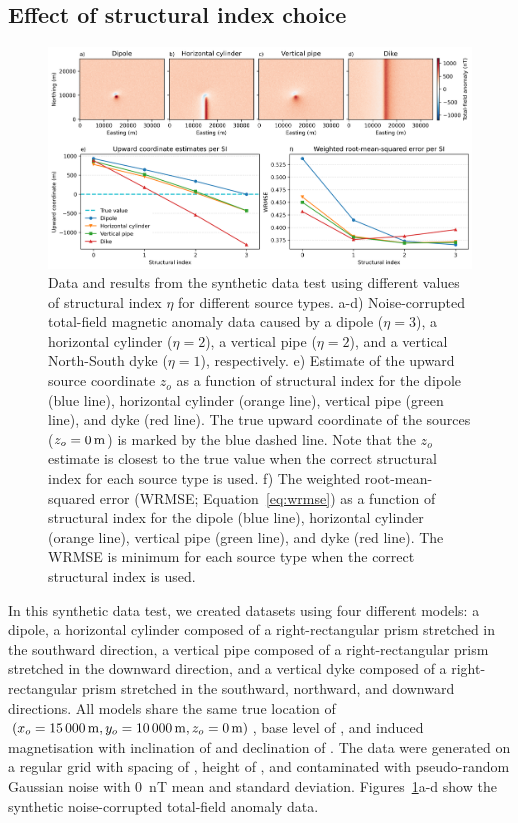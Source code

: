 \subsection{Effect of structural index choice}
\label{sec:si}

\begin{figure}[tb!]
\centering
\includegraphics[width=1\linewidth]{euler-inversion/figures/synthetic-structural-index.png}
\caption{
    Data and results from the synthetic data test using different values of structural index $\eta$ for different source types.
    a-d) Noise-corrupted total-field magnetic anomaly data caused by a dipole ($\eta=3$), a horizontal cylinder ($\eta=2$), a vertical pipe ($\eta=2$), and a vertical North-South dyke ($\eta=1$), respectively.
    e) Estimate of the upward source coordinate $z_o$ as a function of structural index for the dipole (blue line), horizontal cylinder (orange line), vertical pipe (green line), and dyke (red line).
    The true upward coordinate of the sources ($z_o = \SynSITrueUp$) is marked by the blue dashed line. Note that the $z_o$ estimate is closest to the true value when the correct structural index for each source type is used.
    f) The weighted root-mean-squared error (WRMSE; Equation~\ref{eq:wrmse}) as a function of structural index for the dipole (blue line), horizontal cylinder (orange line), vertical pipe (green line), and dyke (red line). The WRMSE is minimum for each source type when the correct structural index is used.
}
\label{fig:si}
\end{figure}

In this synthetic data test, we created datasets using four different models: a dipole, a horizontal cylinder composed of a right-rectangular prism stretched in the southward direction, a vertical pipe composed of a right-rectangular prism stretched in the downward direction, and a vertical dyke composed of a right-rectangular prism stretched in the southward, northward, and downward directions.
All models share the same true location of $(x_o=\SynSITrueEast, y_o=\SynSITrueNorth, z_o=\SynSITrueUp)$, base level of \SynSITrueBase, and induced magnetisation with inclination of \SynSIInc{} and declination of \SynSIDec.
The data were generated on a regular grid with spacing of \SynSISpacing, height of \SynSIHeight, and contaminated with pseudo-random Gaussian noise with \qty{0}{\nano\tesla} mean and \SynSINoise{} standard deviation. Figures~\ref{fig:si}a-d show the synthetic noise-corrupted total-field anomaly data.


